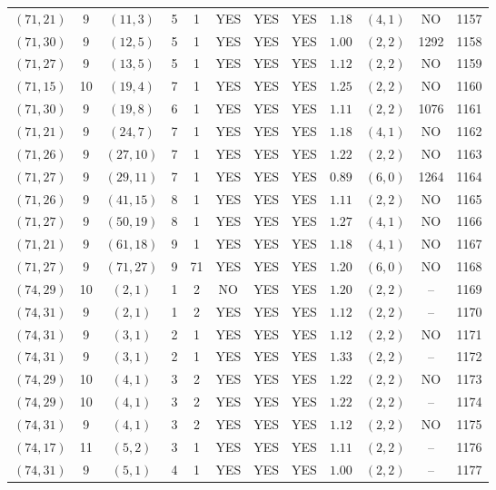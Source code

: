 \begin{longtable}{|c|c|c|c|c|c|c|c|c|c|c|c|}
$(71,21)$ & 9 & $(11,3)$ & 5 & 1 & YES & YES & YES & $1.18$ & $(4,1)$ & NO & 1157\\
$(71,30)$ & 9 & $(12,5)$ & 5 & 1 & YES & YES & YES & $1.00$ & $(2,2)$ & 1292 & 1158\\
$(71,27)$ & 9 & $(13,5)$ & 5 & 1 & YES & YES & YES & $1.12$ & $(2,2)$ & NO & 1159\\
$(71,15)$ & 10 & $(19,4)$ & 7 & 1 & YES & YES & YES & $1.25$ & $(2,2)$ & NO & 1160\\
$(71,30)$ & 9 & $(19,8)$ & 6 & 1 & YES & YES & YES & $1.11$ & $(2,2)$ & 1076 & 1161\\
$(71,21)$ & 9 & $(24,7)$ & 7 & 1 & YES & YES & YES & $1.18$ & $(4,1)$ & NO & 1162\\
$(71,26)$ & 9 & $(27,10)$ & 7 & 1 & YES & YES & YES & $1.22$ & $(2,2)$ & NO & 1163\\
$(71,27)$ & 9 & $(29,11)$ & 7 & 1 & YES & YES & YES & $0.89$ & $(6,0)$ & 1264 & 1164\\
$(71,26)$ & 9 & $(41,15)$ & 8 & 1 & YES & YES & YES & $1.11$ & $(2,2)$ & NO & 1165\\
$(71,27)$ & 9 & $(50,19)$ & 8 & 1 & YES & YES & YES & $1.27$ & $(4,1)$ & NO & 1166\\
$(71,21)$ & 9 & $(61,18)$ & 9 & 1 & YES & YES & YES & $1.18$ & $(4,1)$ & NO & 1167\\
$(71,27)$ & 9 & $(71,27)$ & 9 & 71 & YES & YES & YES & $1.20$ & $(6,0)$ & NO & 1168\\
$(74,29)$ & 10 & $(2,1)$ & 1 & 2 & NO & YES & YES & $1.20$ & $(2,2)$ & -- & 1169\\
$(74,31)$ & 9 & $(2,1)$ & 1 & 2 & YES & YES & YES & $1.12$ & $(2,2)$ & -- & 1170\\
$(74,31)$ & 9 & $(3,1)$ & 2 & 1 & YES & YES & YES & $1.12$ & $(2,2)$ & NO & 1171\\
$(74,31)$ & 9 & $(3,1)$ & 2 & 1 & YES & YES & YES & $1.33$ & $(2,2)$ & -- & 1172\\
$(74,29)$ & 10 & $(4,1)$ & 3 & 2 & YES & YES & YES & $1.22$ & $(2,2)$ & NO & 1173\\
$(74,29)$ & 10 & $(4,1)$ & 3 & 2 & YES & YES & YES & $1.22$ & $(2,2)$ & -- & 1174\\
$(74,31)$ & 9 & $(4,1)$ & 3 & 2 & YES & YES & YES & $1.12$ & $(2,2)$ & NO & 1175\\
$(74,17)$ & 11 & $(5,2)$ & 3 & 1 & YES & YES & YES & $1.11$ & $(2,2)$ & -- & 1176\\
$(74,31)$ & 9 & $(5,1)$ & 4 & 1 & YES & YES & YES & $1.00$ & $(2,2)$ & -- & 1177\\

\end{longtable}
